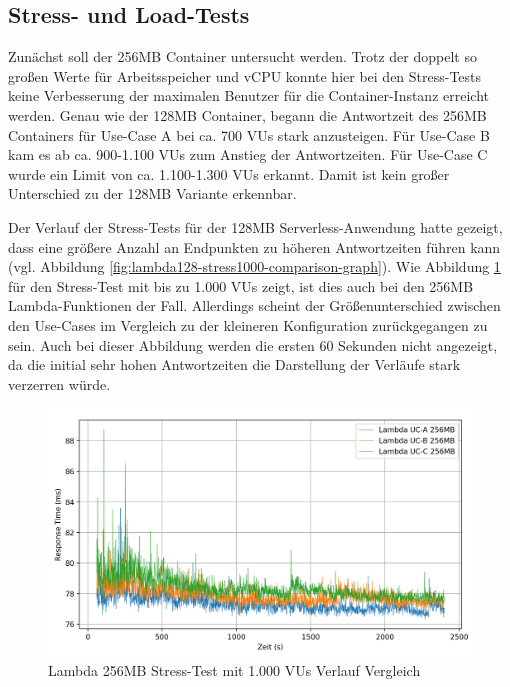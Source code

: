 \subsection{Stress- und Load-Tests}
Zunächst soll der 256MB Container untersucht werden. Trotz der doppelt so großen Werte für Arbeitsspeicher und \ac{vCPU} konnte hier bei den Stress-Tests keine Verbesserung der maximalen Benutzer für die Container-Instanz erreicht werden. Genau wie der 128MB Container, begann die Antwortzeit des 256MB Containers für Use-Case A bei ca. 700 \acp{VU} stark anzusteigen. Für Use-Case B kam es ab ca. 900-1.100 \acp{VU} zum Anstieg der Antwortzeiten. Für Use-Case C wurde ein Limit von ca. 1.100-1.300 \acp{VU} erkannt. Damit ist kein großer Unterschied zu der 128MB Variante erkennbar.

Der Verlauf der Stress-Tests für der 128MB Serverless-Anwendung hatte gezeigt, dass eine größere Anzahl an Endpunkten zu höheren Antwortzeiten führen kann (vgl. Abbildung \ref{fig:lambda128-stress1000-comparison-graph}). Wie Abbildung \ref{fig:lambda256-stress1000-comparison-graph} für den Stress-Test mit bis zu 1.000 \acp{VU} zeigt, ist dies auch bei den 256MB Lambda-Funktionen der Fall. Allerdings scheint der Größenunterschied zwischen den Use-Cases im Vergleich zu der kleineren Konfiguration zurückgegangen zu sein. Auch bei dieser Abbildung werden die ersten 60 Sekunden nicht angezeigt, da die initial sehr hohen Antwortzeiten die Darstellung der Verläufe stark verzerren würde. 

\begin{figure}[H]
    \includegraphics[width=\textwidth]{img/lambda256-stress1000-comparison-graph.png}
    \caption[Lambda 256MB Stress-Test mit 1.000 VUs Verlauf Vergleich]{Lambda 256MB Stress-Test mit 1.000 VUs Verlauf Vergleich}
    \label{fig:lambda256-stress1000-comparison-graph}
\end{figure}

